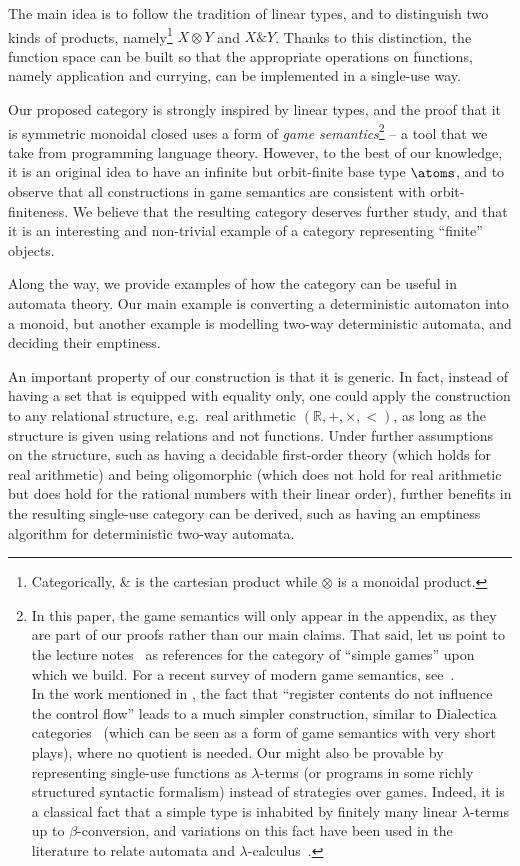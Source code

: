 The main idea is to follow the tradition of linear types, and to  distinguish two kinds of products, namely\footnote{Categorically, $\&$ is the cartesian product while $\otimes$ is a monoidal product.} $X \otimes Y$ and $X \& Y$. Thanks to this distinction, the function space can be built so that the appropriate operations on functions, namely application and currying, can be implemented in a single-use way.

Our proposed category is strongly inspired by linear types, and the proof that it is symmetric monoidal closed uses a form of \emph{game semantics}\footnote{In this paper, the game semantics will only appear in the appendix, as they are part of our proofs rather than our main claims. That said, let us point to the lecture notes~\cite{abramsky2013semantics,Hyland1997} as references for the category of ``simple games'' upon which we build. For a recent survey of modern game semantics, see~\cite{ClairambaultHDR}.\\
  In the work mentioned in , the fact that ``register contents do not influence the control flow'' leads to a much simpler construction, similar to Dialectica categories~\cite{PaivaDialectica} (which can be seen as a form of game semantics with very short plays), where no quotient is needed. Our  might also be provable by representing single-use functions as $\lambda$-terms (or programs in some richly structured syntactic formalism) instead of strategies over games. Indeed, it is a classical fact that a simple type is inhabited by finitely many linear $\lambda$-terms up to $\beta$-conversion, and variations on this fact have been used in the literature to relate automata and $\lambda$-calculus~\cite{IATLC,LambdaTransducer}.} -- a tool that we take from programming language theory. However, to the best of our knowledge, it is an original idea to have an infinite but orbit-finite base type $\atoms$, and to observe that all constructions in game semantics are consistent with orbit-finiteness. We believe that the resulting category deserves further study, and that it is an interesting and non-trivial example of a category representing ``finite'' objects.

Along the way, we provide examples of how the category can be useful in automata theory. Our main example is converting a deterministic automaton into a monoid, but another example is modelling two-way deterministic automata, and deciding their emptiness. 

An important property of our construction is that it is generic. In fact, instead of having a set that is equipped with equality only, one could apply the construction to any relational structure, e.g.~real arithmetic $(\mathbb R, +, \times, <)$, as long as the structure is given using relations and not functions. Under further assumptions on the structure, such as having a decidable first-order theory (which holds for real arithmetic) and being oligomorphic (which does not hold for real arithmetic but does hold for the rational numbers with their linear order), further benefits in the resulting single-use category can be derived, such as having an emptiness algorithm for deterministic two-way automata. 


